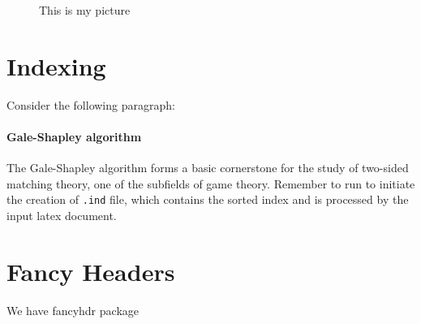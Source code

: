 \documentclass[a4paper,11pt]{article}
\begin{document}
\begin{figure}[!htbp]
  \centering
  \caption{This is my picture}
  \label{}
\end{figure}

\section{Indexing}
Consider the following paragraph:
\paragraph{Gale-Shapley algorithm}
The Gale-Shapley
algorithm
forms a basic cornerstone for the study of two-sided
matching theory,
one of the subfields of
game theory.
\bigbreak
Remember to run  to initiate
the creation of \verb+.ind+ file, which contains the
sorted index and is processed by the input latex document.
\printindex

\section{Fancy Headers}
We have fancyhdr package
\end{document}
